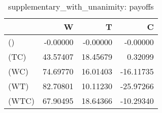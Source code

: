 \begin{table}
\centering
\caption{supplementary_with_unanimity: payoffs}
\begin{tabular}{lrrr}
\toprule
{} &        W &        T &         C \\
\midrule
()    & -0.00000 & -0.00000 &  -0.00000 \\
(TC)  & 43.57407 & 18.45679 &   0.32099 \\
(WC)  & 74.69770 & 16.01403 & -16.11735 \\
(WT)  & 82.70801 & 10.11230 & -25.97266 \\
(WTC) & 67.90495 & 18.64366 & -10.29340 \\
\bottomrule
\end{tabular}
\end{table}
